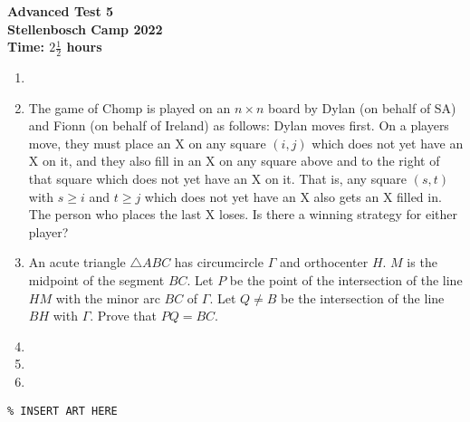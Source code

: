 \documentclass{article}
\begin{document}
\thispagestyle{empty}

\begin{center}
  \textbf{\Large Advanced Test 5}
  \\ \vspace{1em}
  \textbf{\large Stellenbosch Camp 2022}
  \\ \vspace{1em}
  \textbf{\large Time: $2\frac{1}{2}$ hours}
\end{center}

\bigskip \bigskip

\begin{enumerate}[itemsep=\fill]

\item %

 
\item %
The game of Chomp is played on an $n \times n$ board by Dylan (on behalf of SA) and Fionn (on behalf of Ireland) as follows: Dylan moves first. On a players move, they must place an X on any square $(i, j)$ which does not yet have an X on it, and they also fill in an X on any square above and to the right of that square which does not yet have an X on it. That is, any square $(s, t)$ with $s \geq i$ and $t \geq j$ which does not yet have an X also gets an X filled in. The person who places the last X loses. Is there a winning strategy for either player?


\item %
An acute triangle $\triangle ABC$ has circumcircle $\Gamma$ and orthocenter $H$. $M$ is the midpoint of the segment $BC$. Let $P$ be the point of the intersection of the line $HM$ with the minor arc $BC$ of $\Gamma$. Let $Q \neq B$ be the intersection of the line $BH$ with $\Gamma$. Prove that $PQ = BC$.

\item %


\item %


\item %

\end{enumerate}


\vfill
\centering
\small
\begin{BVerbatim}
\end{BVerbatim}
\end{document}
